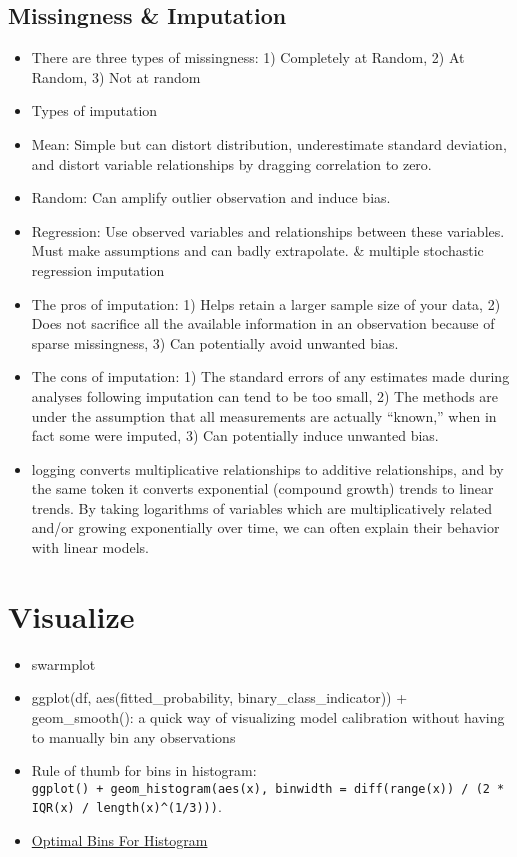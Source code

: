 \documentclass[]{book}
\theoremstyle{definition}
\theoremstyle{definition}
\theoremstyle{definition}
\theoremstyle{remark}
\begin{document}
\subsection{Missingness \& Imputation}\label{missingness-imputation}

\begin{itemize}
\item
  There are three types of missingness: 1) Completely at Random, 2) At
  Random, 3) Not at random
\item
  Types of imputation
\item
  Mean: Simple but can distort distribution, underestimate standard
  deviation, and distort variable relationships by dragging correlation
  to zero.
\item
  Random: Can amplify outlier observation and induce bias.
\item
  Regression: Use observed variables and relationships between these
  variables. Must make assumptions and can badly extrapolate. \&
  multiple stochastic regression imputation
\item
  The pros of imputation: 1) Helps retain a larger sample size of your
  data, 2) Does not sacrifice all the available information in an
  observation because of sparse missingness, 3) Can potentially avoid
  unwanted bias.
\item
  The cons of imputation: 1) The standard errors of any estimates made
  during analyses following imputation can tend to be too small, 2) The
  methods are under the assumption that all measurements are actually
  ``known,'' when in fact some were imputed, 3) Can potentially induce
  unwanted bias.
\item
  logging converts multiplicative relationships to additive
  relationships, and by the same token it converts exponential (compound
  growth) trends to linear trends. By taking logarithms of variables
  which are multiplicatively related and/or growing exponentially over
  time, we can often explain their behavior with linear models.
\end{itemize}

\section{Visualize}\label{visualize-1}

\begin{itemize}
\item
  swarmplot
\item
  ggplot(df, aes(fitted\_probability, binary\_class\_indicator)) +
  geom\_smooth(): a quick way of visualizing model calibration without
  having to manually bin any observations
\item
  Rule of thumb for bins in histogram:
  \texttt{ggplot()\ +\ geom\_histogram(aes(x),\ binwidth\ =\ diff(range(x))\ /\ (2\ *\ IQR(x)\ /\ length(x)\^{}(1/3)))}.
\item
  \href{https://stats.stackexchange.com/questions/798/calculating-optimal-number-of-bins-in-a-histogram/862\#862}{Optimal
  Bins For Histogram}
\end{itemize}
\end{document}
